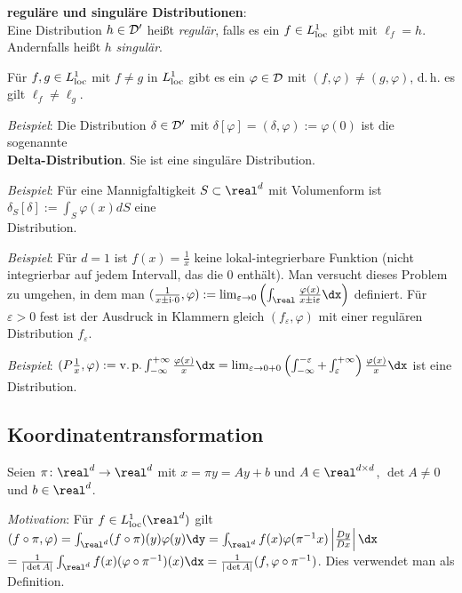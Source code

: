 \linie

\textbf{reguläre und singuläre Distributionen}:\\
Eine Distribution $h \in \mathcal{D}'$ heißt \emph{regulär}, falls
es ein $f \in L^1_{{\operatorname{loc}}}$ gibt mit $\ell_f = h$.\\
Andernfalls heißt $h$ \emph{singulär}.

Für $f, g \in L^1_{{\operatorname{loc}}}$ mit $f \not= g$ in $L^1_{{\operatorname{loc}}}$ gibt es ein
$\varphi \in \mathcal{D}$ mit $(f, \varphi) \not= (g, \varphi)$, d.\,h. es gilt
$\ell_f \not= \ell_g$.

\emph{Beispiel}:
Die Distribution $\delta \in \mathcal{D}'$ mit
$\delta[\varphi] = (\delta, \varphi) := \varphi(0)$ ist die sogenannte\\
\textbf{Delta-Distribution}.
Sie ist eine singuläre Distribution.

\emph{Beispiel}:
Für eine Mannigfaltigkeit $S \subset \real^d$ mit Volumenform ist
$\delta_S[\delta] := \int_S \varphi(x) dS$ eine\\
Distribution.

\emph{Beispiel}:
Für $d = 1$ ist $f(x) = \frac{1}{x}$ keine lokal-integrierbare Funktion
(nicht integrierbar auf jedem Intervall, das die $0$ enthält).
Man versucht dieses Problem zu umgehen, in dem man
$(\frac{1}{x \pm \i \cdot 0}, \varphi) :=
\lim_{\varepsilon \to 0} \left(\int_\real
\frac{\varphi(x)}{x \pm \i \varepsilon} \dx\right)$ definiert.
Für $\varepsilon > 0$ fest ist der Ausdruck in Klammern gleich
$(f_\varepsilon, \varphi)$ mit einer regulären Distribution $f_\varepsilon$.

\emph{Beispiel}:
$(P\frac{1}{x}, \varphi) :=
\vp\int_{-\infty}^{+\infty} \frac{\varphi(x)}{x} \dx =
\lim_{\varepsilon \to 0 + 0} \left(\int_{-\infty}^{-\varepsilon} +
\int_\varepsilon^{+\infty}\right) \frac{\varphi(x)}{x} \dx$
ist eine Distribution.

\pagebreak

\subsection{%
    Koordinatentransformation%
}

Seien $\pi\colon \real^d \rightarrow \real^d$ mit $x = \pi y = Ay + b$
und $A \in \real^{d \times d}$, $\det A \not= 0$ und
$b \in \real^d$.

\emph{Motivation}:
Für $f \in L^1_\loc(\real^d)$ gilt $(f \circ \pi, \varphi) =
\int_{\real^d} (f \circ \pi)(y) \varphi(y) \dy =
\int_{\real^d} f(x) \varphi(\pi^{-1} x) \left|\frac{Dy}{Dx}\right| \dx$\\
$= \frac{1}{|\det A|} \int_{\real^d} f(x) (\varphi \circ \pi^{-1})(x) \dx =
\frac{1}{|\det A|} (f, \varphi \circ \pi^{-1})$.
Dies verwendet man als Definition.

